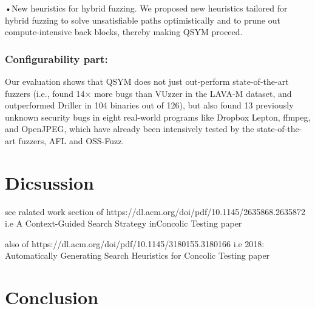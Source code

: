 \documentclass[	runningheads,
				a4paper]{llncs}
\begin{document}
•New heuristics for hybrid fuzzing. We proposed new heuristics tailored for hybrid fuzzing to solve unsatisfiable paths optimistically and to prune out compute-intensive  back  blocks,  thereby  making QSYM proceed.

\subsubsection{Configurability part:}
Our evaluation shows that QSYM does not just out-perform state-of-the-art fuzzers (i.e.,  found 14× more bugs than VUzzer in the LAVA-M dataset, and outperformed Driller in 104 binaries out of 126), but also found 13 previously unknown security bugs in eight real-world programs like Dropbox Lepton, ffmpeg, and OpenJPEG, which have already been intensively tested by the state-of-the-art fuzzers, AFL and OSS-Fuzz.



\section{Dicsussion}
see ralated work section of https://dl.acm.org/doi/pdf/10.1145/2635868.2635872
i.e A Context-Guided Search Strategy inConcolic Testing paper

also of https://dl.acm.org/doi/pdf/10.1145/3180155.3180166
i.e 2018: Automatically Generating Search Heuristics for Concolic Testing paper


\section{Conclusion}







	
\end{document}
